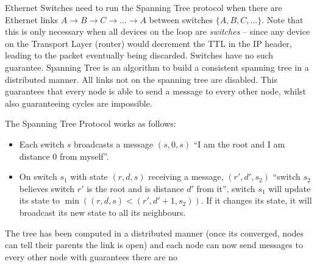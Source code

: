 \documentclass[10pt,\jkfside,a4paper]{article}
\begin{document}
\begin{enumerate}
Ethernet Switches need to run the Spanning Tree protocol when there are
Ethernet links $A \to B \to C \to \dots \to A$ between switches $\{A, B,
C,\dots\}$. Note that this is only necessary when all devices on the loop are
\textit{switches} -- since any device on the Transport Layer (router)
would decrement the TTL in the IP header, leading to the packet eventually
being discarded. Switches have no such guarantee. Spanning Tree is an
algorithm to build a consistent spanning tree in a distributed manner. All
links not on the spanning tree are disabled. This guarantees that every
node is able to send a message to every other node, whilst also
guaranteeing cycles are impossible.

The Spanning Tree Protocol works as follows:

\begin{itemize}

\item Each switch $s$ broadcasts a message $(s, 0, s)$ ``I am the root and
I am distance $0$ from myself''.

\item On switch $s_1$ with state $(r, d, s)$ receiving a message,
$(r', d', s_2)$ ``switch $s_2$ believes switch $r'$ is the root and is
distance $d'$ from it'', switch $s_1$ will update its state to
$\min\left((r, d, s) < (r', d' + 1, s_2)\right)$. If it changes its state,
it will broadcast its new state to all its neighbours.

\end{itemize}

The tree has been computed in a distributed manner (once its converged,
nodes can tell their parents the link is open) and each node can now send
messages to every other node with guarantees there are no

\end{enumerate}
\end{document}

